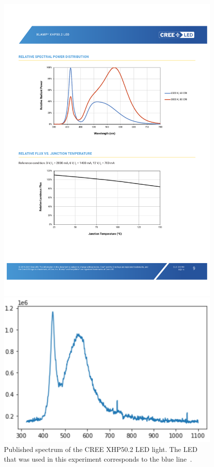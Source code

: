 \begin{figure}[htpb]
    \begin{minipage}{.45\textwidth}
        \includegraphics[trim=3cm 15cm 5cm 6cm, %
            clip, width=\textwidth]{img/pdf/cree_datasheet.pdf}
        \caption{Published spectrum of the CREE XHP50.2 LED
        light. The LED that was used in this
        experiment corresponds to the blue line~\cite{CREE2021}.}
        \label{fig:cree_spectrum}
    \end{minipage}
    \hfill
    \begin{minipage}{.45\textwidth}
        \includegraphics[width=\textwidth]{img/png/measured_led_spectrum.png}

\end{minipage}
\end{figure}
